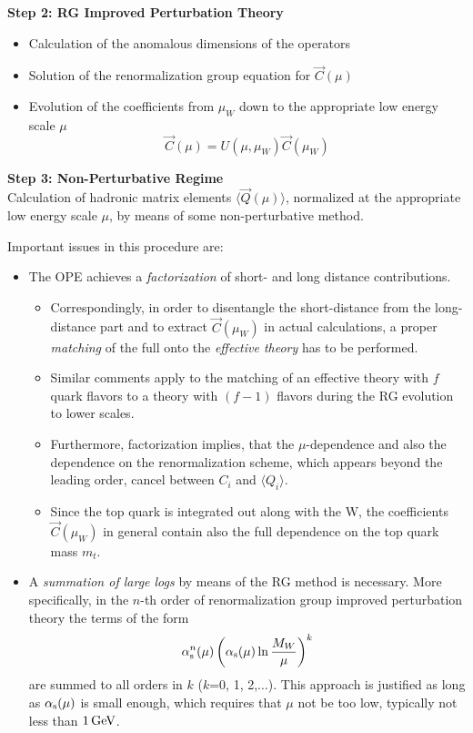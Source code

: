\medskip
\noindent
{\bf Step 2: RG Improved Perturbation Theory}
\\
\begin{itemize}
\item Calculation of the anomalous dimensions of the operators
\item Solution of the renormalization group equation for $\vec{C}(\mu)$
\item Evolution of the coefficients from $\mu_W$ down to the
appropriate low energy scale $\mu$
\begin{displaymath}
\vec C(\mu)=U(\mu, \mu_W)\vec C(\mu_W)
\end{displaymath}
\end{itemize}

\medskip
\noindent
{\bf Step 3: Non-Perturbative Regime}
\\
Calculation of hadronic matrix elements $\langle\vec Q(\mu)\rangle$,
normalized at the appropriate low energy scale $\mu$, by means of
some non-perturbative method.

\bigskip
\noindent
Important issues in this procedure are:
\begin{itemize}
\item The OPE achieves a {\it factorization\/} of short- and long
distance contributions.
\begin{itemize}
\item
Correspondingly, in order to disentangle the short-distance from the
long-distance part and to extract $\vec C(\mu_W)$ in actual
calculations, a proper {\it matching\/} of the full onto the
{\it effective theory\/} has to be performed.
\item Similar comments apply to the matching of an effective theory
with $f$ quark flavors to a theory with $(f-1)$ flavors during the
RG evolution to lower scales.
\item Furthermore, factorization implies, that the $\mu$-dependence
and also the dependence on the renormalization scheme, which
appears beyond the leading order, cancel between $C_i$ and
$\langle Q_i\rangle$.
\item Since the top quark is integrated out along with the W, the
coefficients $\vec C(\mu_W)$ in general contain also the full dependence
on the top quark mass $m_t$.
\end{itemize}
\item A {\it summation of large logs\/} by means of the RG method is
necessary. More specifically, in the $n$-th order of
renormalization group improved perturbation theory the terms of the
form
\begin{displaymath}
\alpha_{\rm s}^n(\mu)\left(\alpha_{\rm s}(\mu)\ln{M_W\over\mu}\right)^k
\end{displaymath}
are summed to all orders in $k$ ($k$=0, 1, 2,$\ldots$). This approach
is justified as long as $\alpha_{\rm s}(\mu)$ is small enough, which
requires that $\mu$ not be too low, typically not less than $1\, {\rm GeV}$.
\end{itemize}

